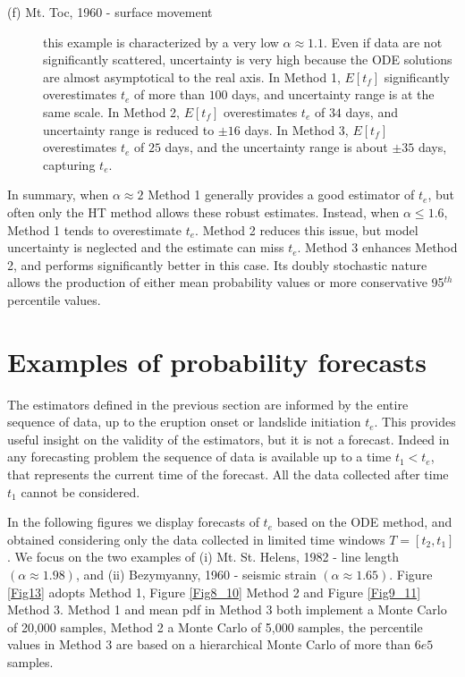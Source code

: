 \documentclass{article}
\begin{document}
\begin{description}
  \item[(f) Mt. Toc, 1960 - surface movement] this example is characterized by a very low $\alpha\approx 1.1$. Even if data are not significantly scattered, uncertainty is very high because the ODE solutions are almost asymptotical to the real axis. In Method 1, $E[t_f]$ significantly overestimates $t_e$ of more than $100$ days, and uncertainty range is at the same scale. In Method 2, $E[t_f]$ overestimates $t_e$ of $34$ days, and uncertainty range is reduced to $\pm 16$ days. In Method 3, $E[t_f]$ overestimates $t_e$ of $25$ days, and the uncertainty range is about $\pm 35$ days, capturing $t_e$.
\end{description}

In summary, when $\alpha\approx 2$ Method 1 generally provides a good estimator of $t_e$, but often only the HT method allows these robust estimates. Instead, when $\alpha \le 1.6$, Method 1 tends to overestimate $t_e$. Method 2 reduces this issue, but model uncertainty is neglected and the estimate can miss $t_e$. Method 3 enhances Method 2, and performs significantly better in this case. Its doubly stochastic nature allows the production of either mean probability values or more conservative 95$^{th}$ percentile values.

\newpage
\section{Examples of probability forecasts}
The estimators defined in the previous section are informed by the entire sequence of data, up to the eruption onset or landslide initiation $t_e$. This provides useful insight on the validity of the estimators, but it is not a forecast. Indeed in any forecasting problem the sequence of data is available up to a time $t_1<t_e$, that represents the current time of the forecast. All the data collected after time $t_1$ cannot be considered.

In the following figures we display forecasts of $t_e$ based on the ODE method, and obtained considering only the data collected in limited time windows $T=[t_2,t_1]$. We focus on the two examples of (i) Mt. St. Helens, 1982 - line length $(\alpha\approx1.98)$, and (ii) Bezymyanny, 1960 - seismic strain $(\alpha\approx1.65)$. Figure \ref{Fig13} adopts Method 1, Figure \ref{Fig8_10} Method 2 and Figure \ref{Fig9_11} Method 3. Method 1 and mean pdf in Method 3 both implement a Monte Carlo of 20,000 samples, Method 2 a Monte Carlo of 5,000 samples, the percentile values in Method 3 are based on a hierarchical Monte Carlo of more than $6e5$ samples.
\end{document}
